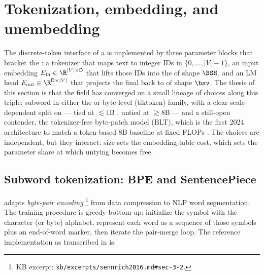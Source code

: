 
\section{Tokenization, embedding, and unembedding}
\label{sec:tokenization-embedding}

The discrete-token interface of a   is implemented by three
parameter blocks that bracket the : a tokenizer that maps
text to integer IDs in $\{0, \dots, |V|-1\}$, an input embedding
$E_{\text{in}} \in \R^{|V| \times \mathsf{D}}$ that lifts those IDs into
the  of shape $\BSH$, and an LM head
$E_{\text{out}} \in \R^{\mathsf{D} \times |V|}$ that projects the final
 back to  of shape $\bsv$. The thesis of this
section is that the field has converged on a small lineage of choices
along this triple: subword  in either the  or
byte-level (tiktoken) family, with a clear scale-dependent split on
 — tied at $\lesssim 1$B , untied at $\gtrsim 8$B —
and a still-open contender, the tokenizer-free byte-patch model (BLT),
which is the first 2024 architecture to match a token-based 8B baseline
at fixed FLOPs \citep{blt2024}. The choices are independent, but they
interact:  size sets the embedding-table cost, which sets the
parameter share at which untying becomes free.

\subsection{Subword tokenization: BPE and SentencePiece}
\label{sec:tok-bpe}

\citet{sennrich2016} adapts \emph{byte-pair encoding} \citep[Gage
1994;][\S 3.2]{sennrich2016}\footnote{KB excerpt:
\nolinkurl{kb/excerpts/sennrich2016.md#sec-3-2}.} from data compression
to NLP word segmentation. The training procedure is greedy bottom-up:
initialize the symbol  with the character (or byte) alphabet,
represent each word as a sequence of those symbols plus an
end-of-word marker, then iterate the pair-merge loop. The reference
implementation as transcribed in \citet[\S 3.2, Algorithm 1]{sennrich2016}
is:

